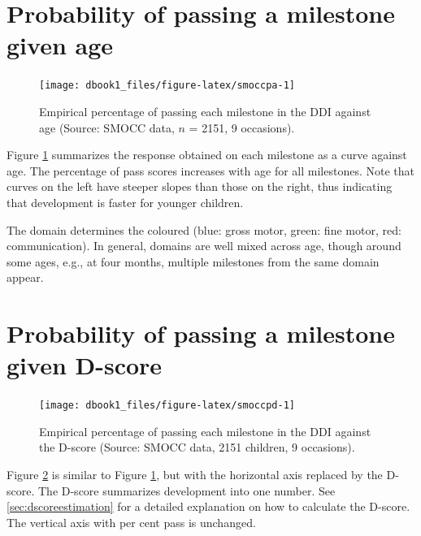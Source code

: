 \documentclass[
]{book}
\begin{document}
\hypertarget{sec:probage}{%
\section{Probability of passing a milestone given age}\label{sec:probage}}

\begin{figure}

{\centering \texttt{[image: dbook1\_files/figure-latex/smoccpa-1]} 

}

\caption{Empirical percentage of passing each milestone in the DDI against age (Source: SMOCC data, \(n\) = 2151, 9 occasions).}\label{fig:smoccpa}
\end{figure}



Figure \ref{fig:smoccpa} summarizes the response obtained on each milestone as a curve against age. The percentage of pass scores increases with age for all milestones. Note that curves on the left have steeper slopes than those on the right, thus indicating that development is faster for younger children.

The domain determines the coloured (blue: gross motor, green: fine motor, red: communication). In general, domains are well mixed across age, though around some ages, e.g., at four months, multiple milestones from the same domain appear.

\hypertarget{sec:probd}{%
\section{Probability of passing a milestone given D-score}\label{sec:probd}}

\begin{figure}

{\centering \texttt{[image: dbook1\_files/figure-latex/smoccpd-1]} 

}

\caption{Empirical percentage of passing each milestone in the DDI against the D-score (Source: SMOCC data, 2151 children, 9 occasions).}\label{fig:smoccpd}
\end{figure}



Figure \ref{fig:smoccpd} is similar to Figure \ref{fig:smoccpa}, but with the horizontal axis replaced by the D-score. The D-score summarizes development into one number. See \ref{sec:dscoreestimation} for a detailed explanation on how to calculate the D-score. The vertical axis with per cent pass is unchanged.
\end{document}
